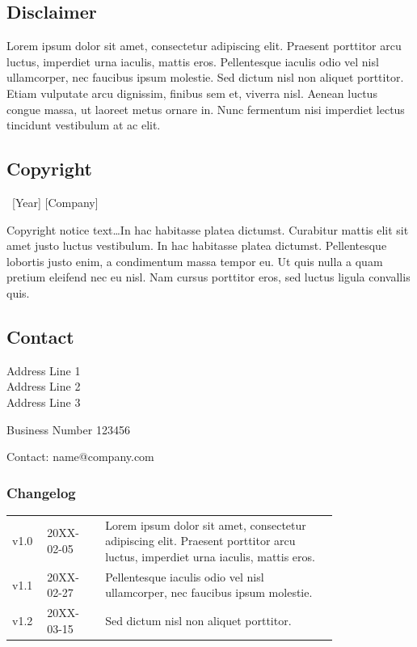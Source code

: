 \documentclass[
	a4paper, %
	11pt, %
]{DC_Report}
\begin{document}
\begin{twothirdswidth} %
	\footnotesize %
	
	\subsection*{Disclaimer}

	Lorem ipsum dolor sit amet, consectetur adipiscing elit. Praesent porttitor arcu luctus, imperdiet urna iaculis, mattis eros. Pellentesque iaculis odio vel nisl ullamcorper, nec faucibus ipsum molestie. Sed dictum nisl non aliquet porttitor. Etiam vulputate arcu dignissim, finibus sem et, viverra nisl. Aenean luctus congue massa, ut laoreet metus ornare in. Nunc fermentum nisi imperdiet lectus tincidunt vestibulum at ac elit.
	
	\subsection*{Copyright}
	
	\textcopyright~[Year] [Company] 
	
	Copyright notice text\ldots In hac habitasse platea dictumst. Curabitur mattis elit sit amet justo luctus vestibulum. In hac habitasse platea dictumst. Pellentesque lobortis justo enim, a condimentum massa tempor eu. Ut quis nulla a quam pretium eleifend nec eu nisl. Nam cursus porttitor eros, sed luctus ligula convallis quis.
	
	\subsection*{Contact}
	
	Address Line 1\\
	Address Line 2\\
	Address Line 3
	
	Business Number 123456
	
	Contact: name@company.com
	
	\vfill %
	
	\subsubsection*{Changelog}
	
	\scriptsize %
	
	\begin{tabular}{@{} L{0.05\linewidth} L{0.15\linewidth} L{0.6\linewidth} @{}} %
		\toprule
		v1.0 & 20XX-02-05 & Lorem ipsum dolor sit amet, consectetur adipiscing elit. Praesent porttitor arcu luctus, imperdiet urna iaculis, mattis eros.\\
		v1.1 & 20XX-02-27 & Pellentesque iaculis odio vel nisl ullamcorper, nec faucibus ipsum molestie.\\
		v1.2 & 20XX-03-15 & Sed dictum nisl non aliquet porttitor.\\
		\bottomrule
	\end{tabular}
\end{twothirdswidth}
\end{document}
